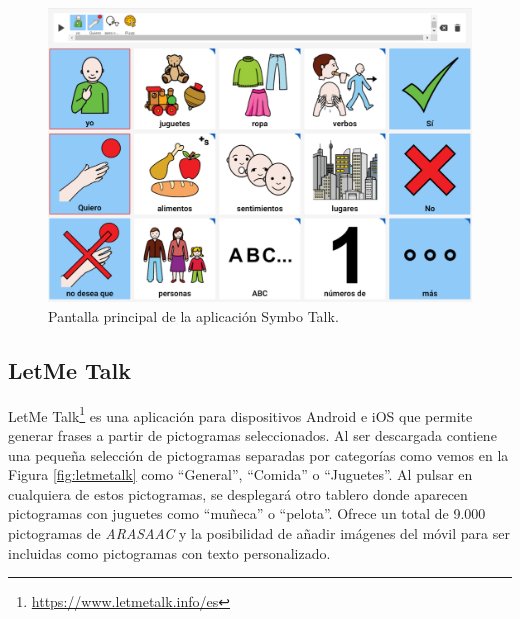 \begin{figure}[h!]
	\centering
	\includegraphics[width=0.7\linewidth]{Imagenes/Bitmap/SymboTalk}
	\caption{Pantalla principal de la aplicación Symbo Talk.}
	\label{fig:symbotalk}
\end{figure}

\newpage
\subsection{LetMe Talk}

LetMe Talk\footnote{\url{ https://www.letmetalk.info/es}} es una aplicación para dispositivos Android e iOS que permite generar frases a partir de pictogramas seleccionados. Al ser descargada contiene una pequeña selección de pictogramas separadas por categorías como vemos en la Figura \ref{fig:letmetalk} como “General”, “Comida” o “Juguetes”. Al pulsar en cualquiera de estos pictogramas, se desplegará otro tablero donde aparecen pictogramas con juguetes como “muñeca” o “pelota”. 
Ofrece un total de 9.000 pictogramas de \textit{ARASAAC} y la posibilidad de añadir imágenes del móvil para ser incluidas como pictogramas con texto personalizado. 


